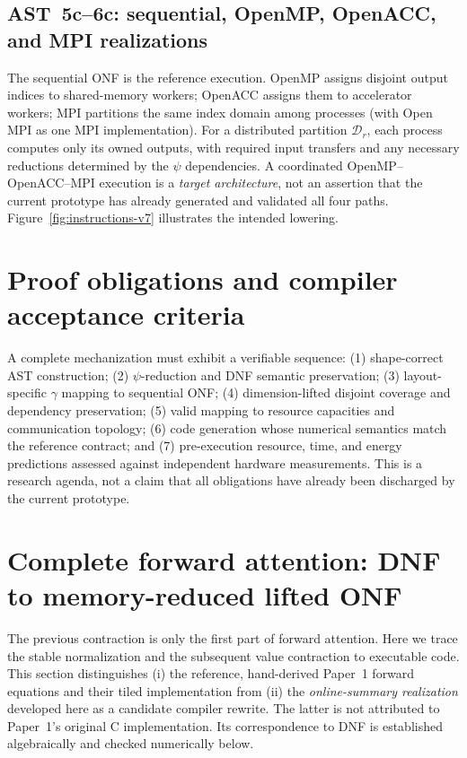 \documentclass[11pt]{article}
\begin{document}
\subsection{AST~5c--6c: sequential, OpenMP, OpenACC, and MPI realizations}
The sequential ONF is the reference execution. OpenMP assigns disjoint output indices to shared-memory workers; OpenACC assigns them to accelerator workers; MPI partitions the same index domain among processes (with Open MPI as one MPI implementation). For a distributed partition $\mathcal D_r$, each process computes only its owned outputs, with required input transfers and any necessary reductions determined by the $\psi$ dependencies. A coordinated OpenMP--OpenACC--MPI execution is a \emph{target architecture}, not an assertion that the current prototype has already generated and validated all four paths. Figure~\ref{fig:instructions-v7} illustrates the intended lowering.

\section{Proof obligations and compiler acceptance criteria}
A complete mechanization must exhibit a verifiable sequence: (1) shape-correct AST construction; (2) $\psi$-reduction and DNF semantic preservation; (3) layout-specific $\gamma$ mapping to sequential ONF; (4) dimension-lifted disjoint coverage and dependency preservation; (5) valid mapping to resource capacities and communication topology; (6) code generation whose numerical semantics match the reference contract; and (7) pre-execution resource, time, and energy predictions assessed against independent hardware measurements. This is a research agenda, not a claim that all obligations have already been discharged by the current prototype.


\section{Complete forward attention: DNF to memory-reduced lifted ONF}
\label{sec:full-forward}
The previous contraction is only the first part of forward attention. Here we trace the stable normalization and the subsequent value contraction to executable code. This section distinguishes (i) the reference, hand-derived Paper~1 forward equations and their tiled implementation from (ii) the \emph{online-summary realization} developed here as a candidate compiler rewrite. The latter is not attributed to Paper~1's original C implementation. Its correspondence to DNF is established algebraically and checked numerically below.
\end{document}
